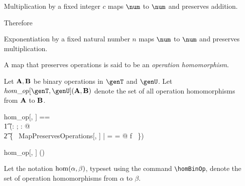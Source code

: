 \documentclass{amsart}
\begin{document}
\begin{example}
Multiplication by a fixed integer $c$ maps $\num$ to $\num$ and preserves addition.

Therefore
\end{example}

\begin{example}
Exponentiation by a fixed natural number $n$ maps $\num$ to $\num$ and preserves multiplication.
\end{example}

A map that preserves operations is said to be an \textit{operation homomorphism}.

Let $\mathbf{A}, \mathbf{B}$ be binary operations in $\genT$ and $\genU$. 
Let $hom\_op[\genT, \genU](\strucA, \strucB)$ denote the set of all operation homomorphisms from $\mathbf{A}$ to $\mathbf{B}$.

\begin{zed}
	hom\_op[\genT, \genU] == \\
	\t1	(\lambda \alpha: \binop \genT; \beta: \binop \genU @ \\
	\t2		\{~ MapPreservesOperations[\genT, \genU] | \alpha = \strucA \land \beta = \strucB @ f ~\})
\end{zed}

\begin{remark}
\begin{zed}
	hom\_op[\setT, \setU] \in \binop \setT \cross \binop \setU \fun \power (\setT \pfun \setU)
\end{zed}
\end{remark}

Let the notation $\operatorname{hom}(\alpha, \beta)$,  typeset using the command \verb|\homBinOp|, 
denote the set of operation homomorphisms from $\alpha$ to $\beta$.
\end{document}
